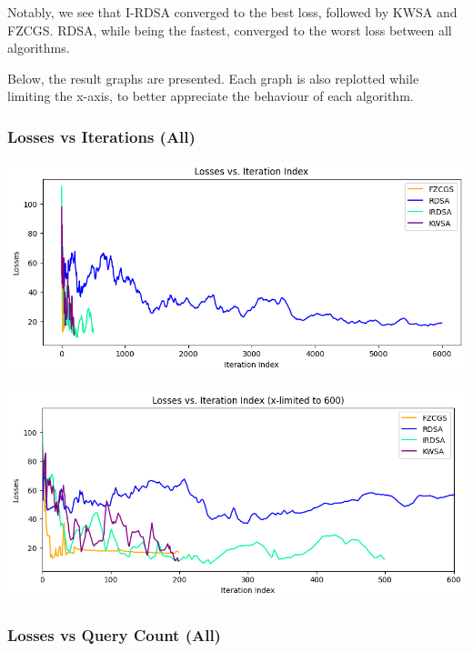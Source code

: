 \documentclass[10pt,twocolumn,letterpaper]{article}
\begin{document}
Notably, we see that I-RDSA converged to the best loss, followed by KWSA and FZCGS.
RDSA, while being the fastest, converged to the worst loss between all algorithms.

Below, the result graphs are presented. Each graph is also replotted
while limiting the x-axis, to better appreciate the behaviour of each algorithm.

\subsubsection*{Losses vs Iterations (All)}

\begin{center}
   \includegraphics*[scale=0.35]{img/All_loss_vs_iterations.png}
\end{center}
\begin{center}
   \includegraphics*[scale=0.35]{img/xLimit_All_loss_vs_iterations.png}\\
\end{center} 

\subsubsection*{Losses vs Query Count (All)}
\end{document}
